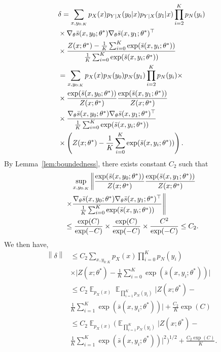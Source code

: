 \documentclass[11pt,a4paper]{article}
\DeclareMathOperator{\E}{\mathbb{E}}
\newcommand{\gtheta}{\ensuremath \nabla_{\theta}}
\newcommand{\ssf}[3]{\bar{s}(#1, #2; #3)}
\begin{document}
\begin{equation*}
\begin{aligned}
 & \delta = \sum_{ x, y_{0:K} } p_X(x)p_{Y|X}(y_0|x)p_{Y|X}(y_1|x)\prod_{i=2}^K p_N(y_i) \\
 & \times \gtheta \ssf{x}{y_0}{\theta^*}\gtheta   \ssf{x}{y_1}{\theta^*}^\top \\
 & \times \frac{Z(x; \theta^*) - \frac{1}{K}\sum_{i=0}^K \exp( \ssf{x}{y_i}{\theta^*})}{\frac{1}{K}\sum_{i=0}^K \exp( \ssf{x}{y_i}{\theta^*})} \\
 & = \sum_{x, y_{0:K}} p_X(x) p_{N}(y_0) p_{N}(y_1) \prod_{i=2}^K p_N(y_i)  \times \\ 
 & \times \frac{\exp(\ssf{x}{y_0}{\theta^*})}{Z(x; \theta^*)} \frac{\exp( \ssf{x}{y_1}{\theta^*})}{Z(x; \theta^*)}\\
 & \times  \frac{\gtheta \ssf{x}{y_0}{\theta^*}\gtheta   \ssf{x}{y_1}{\theta^*}^\top }{\frac{1}{K}\sum_{i=0}^K \exp( \ssf{x}{y_i}{\theta^*})} \\
 & \times \left(Z(x; \theta^*) - \frac{1}{K}\sum_{i=0}^K \exp( \ssf{x}{y_i}{\theta^*})\right).
\end{aligned}
\end{equation*}
By Lemma~\ref{lem:boundedness}, there exists constant $C_2$ such that
\begin{equation*}
\begin{aligned}
& \quad \sup_{x, y_{0:K}} \left\| \frac{\exp(\ssf{x}{y_0}{\theta^*})}{Z(x; \theta^*)}\frac{\exp( \ssf{x}{y_1}{\theta^*})}{Z(x; \theta^*)} \right. \\
& \left. \times \frac{\gtheta \ssf{x}{y_0}{\theta^*}\gtheta   \ssf{x}{y_1}{\theta^*}^\top }{\frac{1}{K}\sum_{i=0}^K \exp( \ssf{x}{y_i}{\theta^*})}\right\|  \\
& \leq  \frac{\exp(C)}{\exp(-C)} \times \frac{\exp(C)}{\exp(-C)}\times \frac{C^2}{\exp(-C)} \leq C_2.
\end{aligned}
\end{equation*}
We then have, 
\begin{equation*}
\begin{aligned}
 \left\| \delta\right\| & \leq C_2 \sum_{x, y_{0:K}} p_X(x) \prod_{i=0}^K p_N(y_i) \\
 & \times \Big|Z(x; \theta^*) - \frac{1}{K}\sum_{i=0}^K \exp \left(\ssf{x}{y_i}{\theta^*}\right) \Big | \\
 & \leq C_2 \E_{p_X(x)}\E_{\prod_{i=1}^K p_N(y_i)}  \Big|Z(x; \theta^*) -  \\
 &  \frac{1}{K} \sum_{i=1}^K \exp \left(\ssf{x}{y_i}{\theta^*}\right) \Big| + \frac{C_2}{K}\exp(C)\\
 & \leq C_2 \E_{p_X(x)} \Big(\E_{\prod_{i=1}^K p_N(y_i)} \Big|Z(x; \theta^*) - \\
 &  \frac{1}{K}\sum_{i=1}^K \exp( \ssf{x}{y_i}{\theta^*})\Big| ^2 \Big)^{1/2} + \frac{C_2\exp(C)}{K}.
\end{aligned}
\end{equation*}
\end{document}
